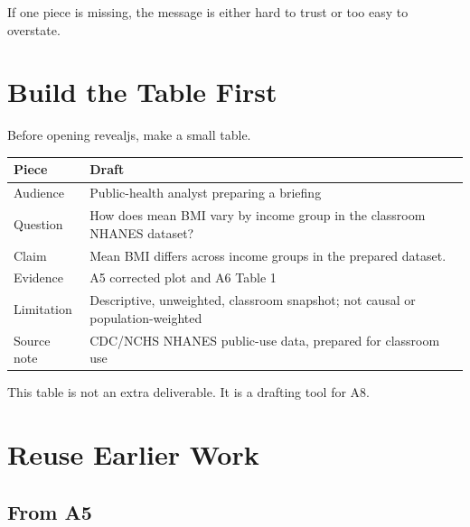 \documentclass[
  letterpaper,
  DIV=11,
  numbers=noendperiod,
  oneside]{scrreprt}
\begin{document}
If one piece is missing, the message is either hard to trust or too easy
to overstate.

\section*{Build the Table First}\label{build-the-table-first}


Before opening revealjs, make a small table.

\begin{longtable}[]{@{}
  >{\raggedright\arraybackslash}p{}
  >{\raggedright\arraybackslash}p{}@{}}
\toprule\noalign{}
\begin{minipage}[b]{\linewidth}\raggedright
Piece
\end{minipage} & \begin{minipage}[b]{\linewidth}\raggedright
Draft
\end{minipage} \\
\midrule\noalign{}
\endhead
\bottomrule\noalign{}
\endlastfoot
Audience & Public-health analyst preparing a briefing \\
Question & How does mean BMI vary by income group in the classroom
NHANES dataset? \\
Claim & Mean BMI differs across income groups in the prepared
dataset. \\
Evidence & A5 corrected plot and A6 Table 1 \\
Limitation & Descriptive, unweighted, classroom snapshot; not causal or
population-weighted \\
Source note & CDC/NCHS NHANES public-use data, prepared for classroom
use \\
\end{longtable}

This table is not an extra deliverable. It is a drafting tool for A8.

\section*{Reuse Earlier Work}\label{reuse-earlier-work}


\subsection*{From A5}\label{from-a5}
\end{document}
